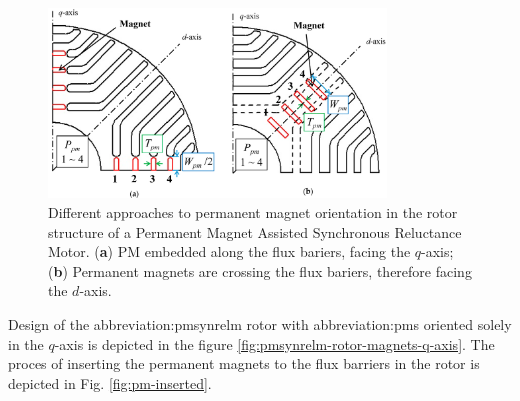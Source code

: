 \documentclass[a4paper, twoside, 11pt]{article}
\begin{document}
    \begin{figure}[htbp!]
            \centering
            \includegraphics[width=0.8\textwidth]{src/png/pmsynrelm-rotor-magnets-position.png}
            \caption{Different approaches to permanent magnet orientation in the rotor structure of a Permanent Magnet Assisted Synchronous Reluctance Motor. (\textbf{a}) PM embedded along the flux bariers, facing the $q$-axis; (\textbf{b}) Permanent magnets are crossing the flux bariers, therefore facing the $d$-axis. \cite{ngo-performance-analysis-of-synchronous-reluctance-motor-with-limited-amount-of-permanent-magnet}}
            \label{fig:pmsynrelm-rotor-magnets-position}
    \end{figure}

    Design of the \gls{abbreviation:pmsynrelm} rotor with \gls{abbreviation:pm}s oriented solely in the $q$-axis is depicted in the figure \ref{fig:pmsynrelm-rotor-magnets-q-axis}. The proces of inserting the permanent magnets to the flux barriers in the rotor is depicted in Fig. \ref{fig:pm-inserted}.
    
\end{document}
